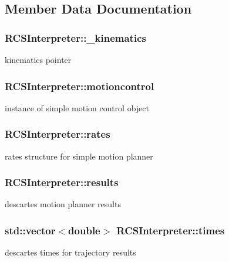 \subsection{Member Data Documentation}
\hypertarget{classRCSInterpreter_a0a78e67ba785253bf3de6877294da699}{
\subsubsection[{\-\_\-kinematics}]{ R\-C\-S\-Interpreter\-::\-\_\-kinematics}}\label{classRCSInterpreter_a0a78e67ba785253bf3de6877294da699}
kinematics pointer \hypertarget{classRCSInterpreter_ae59648ec8d61ea6957bbd320f2a4665a}{
\subsubsection[{motioncontrol}]{ R\-C\-S\-Interpreter\-::motioncontrol}}\label{classRCSInterpreter_ae59648ec8d61ea6957bbd320f2a4665a}
instance of simple motion control object \hypertarget{classRCSInterpreter_a11b1a673682a9d0451877d3b5c3e0e3e}{
\subsubsection[{rates}]{ R\-C\-S\-Interpreter\-::rates}}\label{classRCSInterpreter_a11b1a673682a9d0451877d3b5c3e0e3e}
rates structure for simple motion planner \hypertarget{classRCSInterpreter_a7b71ecaad68a14cc341d98d463e6f5b5}{
\subsubsection[{results}]{ R\-C\-S\-Interpreter\-::results}}\label{classRCSInterpreter_a7b71ecaad68a14cc341d98d463e6f5b5}
descartes motion planner results \hypertarget{classRCSInterpreter_a2437a1768cfa972b39ff56c8f16ff3c1}{
\subsubsection[{times}]{\setlength{\rightskip}{0pt plus 5cm}std\-::vector$<$double$>$ R\-C\-S\-Interpreter\-::times}}\label{classRCSInterpreter_a2437a1768cfa972b39ff56c8f16ff3c1}
descartes times for trajectory results 

